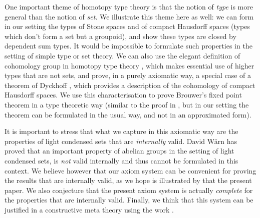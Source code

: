 One important theme of homotopy type theory is that the notion of {\em type} is more general than the notion of {\em set}. We illustrate
this theme here as well: we can form in our setting the types of Stone spaces and of compact Hausdorff spaces
(types which don't form a set but a groupoid),
and show these types are
closed by dependent sum types. It would be impossible to formulate such properties in the setting of simple type or set theory.
We can also use the elegant definition of cohomology group in homotopy type theory \cite{HoTT}, which makes essential
use of higher types that are not sets, and prove, in a purely axiomatic way,
a special case of a theorem of Dyckhoff \cite{dyckhoff76}, which provides
a description of the cohomology of compact Hausdorff spaces. We use this characterisation to prove Brouwer's fixed point theorem
in a type theoretic way (similar to the proof in \cite{shulman-Brouwer-fixed-point}, but
in our setting the theorem can be formulated in the usual
way, and not in an approximated form).

It is important to stress that what we capture in this axiomatic way are the properties of light condensed
sets that are {\em internally} valid. David W\"arn \cite{warn24} has proved that an important property of abelian
groups in the setting of light condensed sets, is {\em not} valid internally and thus cannot be formulated in this context.
We believe however that our axiom system can be convenient for proving the results that are internally valid, as we hope
is illustrated by that the present paper. We also conjecture that the present axiom system is actually {\em complete}
for the properties that are internally valid. Finally, we think that this system can be justified in a constructive meta theory
using the work \cite{CRS21}.
